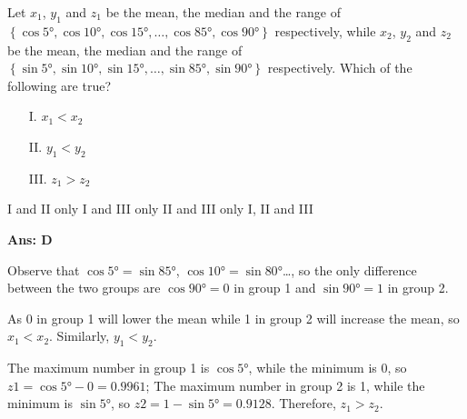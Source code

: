 \documentclass[border=3pt,varwidth=82.5mm]{standalone}
\begin{document}
Let $x_1$, $y_1$ and $z_1$ be the mean, the median and the range of $\left\lbrace \cos\ang{5}, \cos\ang{10}, \cos\ang{15},\ldots,\cos\ang{85}, \cos\ang{90}\right\rbrace$ respectively, while $x_2$, $y_2$ and $z_2$ be the mean, the median and the range of $\left\lbrace \sin\ang{5}, \sin\ang{10}, \sin\ang{15},\ldots,\sin\ang{85}, \sin\ang{90}\right\rbrace$ respectively. Which of the following are true?
\begin{itemize}
\item[I.] $x_1 < x_2$
\item[II.] $y_1 < y_2$
\item[III.] $z_1 > z_2$
\end{itemize}

\begin{choices}
\choice I and II only
\choice I and III only
\choice II and III only
\choice I, II and III%
\end{choices}


\begin{answer}
\hrulefill\par
\textbf{Ans: D}

Observe that $\cos\ang{5}=\sin\ang{85}$, $\cos\ang{10}=\sin\ang{80}$\ldots, so the only difference between the two groups are $\cos\ang{90}=0$ in group 1 and $\sin\ang{90}=1$ in group 2.

As 0 in group 1 will lower the mean while 1 in group 2 will increase the mean, so $x_1 < x_2$. Similarly, $y_1 < y_2$.

The maximum number in group 1 is $\cos\ang{5}$, while the minimum is 0, so $z1=\cos\ang{5}-0=0.9961$; The maximum number in group 2 is 1, while the minimum is $\sin\ang{5}$, so $z2=1-\sin\ang{5}=0.9128$. Therefore, $z_1 > z_2$.

\end{answer}
\end{document}
